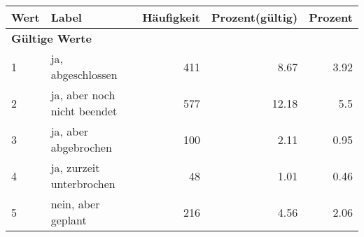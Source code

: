      \begin{longtable}{lXrrr}
     \toprule
     \textbf{Wert} & \textbf{Label} & \textbf{Häufigkeit} & \textbf{Prozent(gültig)} & \textbf{Prozent} \\
     \endhead
     \midrule
     \multicolumn{5}{l}{\textbf{Gültige Werte}}\\

     1 &
     \multicolumn{1}{X}{ ja, abgeschlossen   } &


       \num{411} &
       \num[round-mode=places,round-precision=2]{8,67} &
         \num[round-mode=places,round-precision=2]{3,92} \\

     2 &
     \multicolumn{1}{X}{ ja, aber noch nicht beendet   } &


       \num{577} &
       \num[round-mode=places,round-precision=2]{12,18} &
         \num[round-mode=places,round-precision=2]{5,5} \\

     3 &
     \multicolumn{1}{X}{ ja, aber abgebrochen   } &


       \num{100} &
       \num[round-mode=places,round-precision=2]{2,11} &
         \num[round-mode=places,round-precision=2]{0,95} \\

     4 &
     \multicolumn{1}{X}{ ja, zurzeit unterbrochen   } &


       \num{48} &
       \num[round-mode=places,round-precision=2]{1,01} &
         \num[round-mode=places,round-precision=2]{0,46} \\

     5 &
     \multicolumn{1}{X}{ nein, aber geplant   } &


       \num{216} &
       \num[round-mode=places,round-precision=2]{4,56} &
         \num[round-mode=places,round-precision=2]{2,06} \\


\end{longtable}
